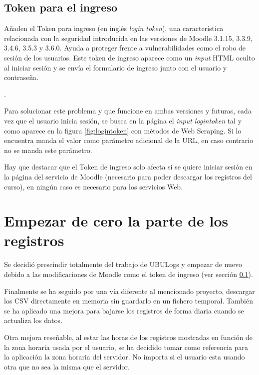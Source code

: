 \subsection{Token para el ingreso} \label{sec:logintoken}
Añaden el Token para ingreso\cite{noauthor_token_nodate} (en inglés \textit{login token}), una característica relacionada con la seguridad introducida en las versiones de Moodle 3.1.15, 3.3.9, 3.4.6, 3.5.3 y 3.6.0. Ayuda a proteger frente a vulnerabilidades como el robo de sesión de los usuarios. Este token de ingreso aparece como un \textit{input} HTML oculto\cite{noauthor_html_nodate-1} al iniciar sesión y se envía el formulario de ingreso junto con el usuario y contraseña.

.

Para solucionar este problema y que funcione en ambas versiones y futuras, cada vez que el usuario inicia sesión, se busca en la página el \textit{input logintoken} tal y como aparece en la figura \ref{fig:logintoken} con métodos de Web Scraping\cite{marti_que_2016}. Si lo encuentra manda el valor como parámetro adicional de la URL, en caso contrario no se manda este parámetro.

Hay que destacar que el Token de ingreso solo afecta si se quiere iniciar sesión en la página del servicio de Moodle (necesario para poder descargar los registros del curso), en ningún caso es necesario para los servicios Web.

\section{Empezar de cero la parte de los registros}

Se decidió prescindir totalmente del trabajo de UBULogs y empezar de nuevo debido a las modificaciones de Moodle como el token de ingreso (ver sección \ref{sec:logintoken}). 

Finalmente se ha seguido por una vía diferente al mencionado proyecto, descargar los CSV directamente en memoria sin guardarlo en un fichero temporal. También se ha aplicado una mejora para bajarse los registros de forma diaria cuando se actualiza los datos.

Otra mejora reseñable, al estar las horas de los registros mostradas en función de la zona horaria usada por el usuario, se ha decidido tomar como referencia para la aplicación la zona horaria del servidor. No importa si el usuario esta usando otra que no sea la misma que el servidor.

